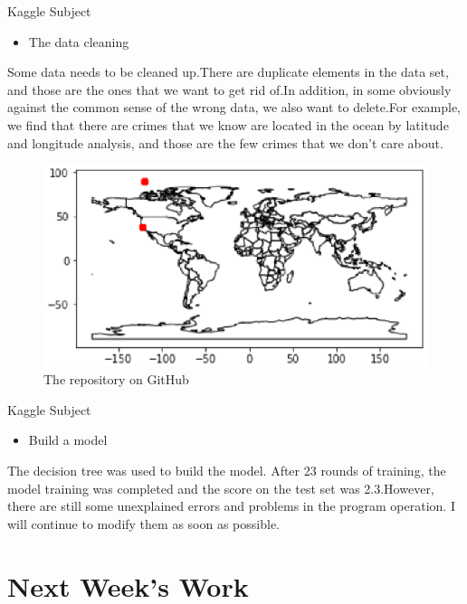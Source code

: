 \documentclass[
 size=14pt,
 paper=smartboard,  %
 mode=present, 		%
 display=slides, 	%
 style=tuliplab,  	%
 pauseslide,
 fleqn,leqno]{powerdot}
\begin{document}
\begin{slide}[toc=,bm=]{Kaggle Subject}
	\begin{itemize}
		\item The data cleaning
	\end{itemize}
	\bigskip
	Some data needs to be cleaned up.There are duplicate elements in the data set, and those are the ones that we want to get rid of.In addition, in some obviously against the common sense of the wrong data, we also want to delete.For example, we find that there are crimes that we know are located in the ocean by latitude and longitude analysis, and those are the few crimes that we don't care about.
	\begin{center}
		\begin{figure}[htbp]
			\includegraphics[scale=0.6]{./pic/cf_map.eps}
			\caption{The repository on GitHub}
		\end{figure}
	\end{center}	
	
\end{slide}

\begin{slide}[toc=,bm=]{Kaggle Subject}
	\begin{itemize}
		\item Build a model
	\end{itemize}
	\bigskip
	The decision tree was used to build the model. After 23 rounds of training, the model training was completed and the score on the test set was 2.3.However, there are still some unexplained errors and problems in the program operation. I will continue to modify them as soon as possible.
	
\end{slide}

\section{Next Week's Work}
\end{document}
